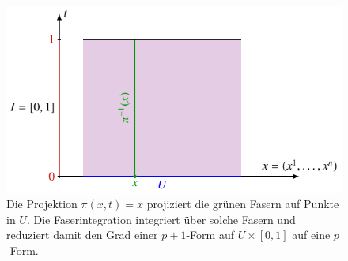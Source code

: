 %
%
%
\begin{figure}
\centering
\includegraphics{chapters/060-pformen/images/faserintegration.pdf}
\caption{Die Projektion $\pi(x,t)=x$ projiziert die grünen Fasern
auf Punkte in $U$. Die Faserintegration integriert über solche Fasern
und reduziert damit den Grad einer $p+1$-Form auf $U\times [0,1]$
auf eine $p$-Form.
\label{buch:pformen:poincarelemma:fig:faserintegration}}
\end{figure}
